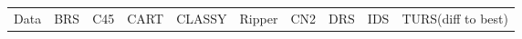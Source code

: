 \begin{table}[ht]
\small
\centering
\begin{tabular}{l|llllllll|l}
  \hline
Data & BRS & C45 & CART & CLASSY & Ripper & CN2 & DRS & IDS & TURS\tiny{(diff to best)} \\ 

\end{tabular}
\end{table}
